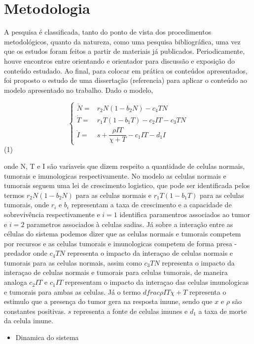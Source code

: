 \documentclass[12pt, a4paper]{article}
\begin{document}
\section{Metodologia}

A pesquisa é classificada, tanto do ponto de vista dos procedimentos metodológicos, quanto da natureza, como uma pesquisa bibliográfica, uma vez que os estudos foram feitos a partir de materiais já publicados. Periodicamente, houve encontros entre orientando e orientador para discussão e exposição do conteúdo estudado. Ao final, para colocar em prática os conteúdos apresentados, foi proposto o estudo de uma dissertação (referencia) para aplicar o conteúdo ao modelo apresentado no trabalho.
Dado o modelo,
\begin{center}
$$
\left \{
\begin{array}{rl}
\dot N = & r_2 N (1-b_2N)-c_4 TN \\
\dot T = & r_1 T (1-b_1T)-c_2 IT - c_3 TN \\
\dot I = & s+\dfrac{\rho I T}{\chi + T} - c_1 I T - d_1 I
\end{array}
\right .
$$ (1)
\end{center}

onde N, T e I são variaveis que dizem respeito a quantidade de celulas normais, tumorais e imunologicas respectivamente. No modelo as celulas normais e tumorais seguem uma lei de crescimento logistico, que pode ser identificada pelos termos $r_2 N (1-b_2N)$ para as celulas normais e $r_1 T (1-b_1T)$ para as celulas tumorais, onde $r_i$ e $b_i$ representam a taxa de crescimento e a capacidade de sobrevivência respectivamente e $i=1$ identifica paramentros associados ao tumor e $i=2$ parametros associados à celulas sadias. Já sobre a interação entre as células do sistema podemos dizer que as celulas normais e tumorais competem por recursos e as celulas tumorais e imunologicas competem de forma presa - predador onde $c_4 TN$ representa o impacto da interaçao de celulas normais e tumorais para as celulas normais, assim como $c_3 TN$ representa o impacto da interaçao de celulas normais e tumorais para celulas tumorais, de maneira analoga  $c_2 IT$ e $c_1 I T$ representam o impacto da interaçao das celulas imunologicas e tumorais para ambas as celulas. Já o termo $dfrac{\rho I T}{\chi + T}$ representa o estimulo que a presença do tumor gera na resposta imune, sendo que $x$ e $\rho$ são constantes positivas. $s$ representa a fonte de celulas imunes e $d_1$ a taxa de morte da celula imune.

\begin{itemize}
\item Dinamica do sistema
\end{itemize}
\end{document}
